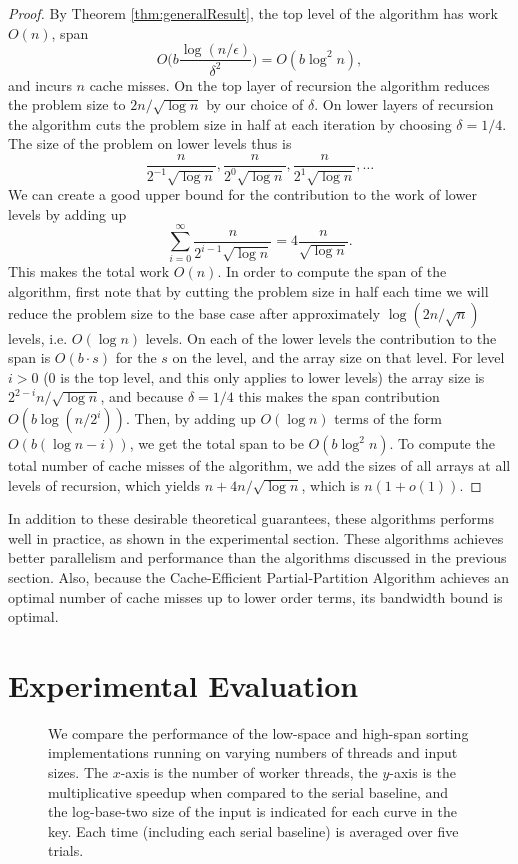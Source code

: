 \documentclass[sigconf]{acmart}
\theoremstyle{remark}
\theoremstyle{remark}
\begin{document}
\begin{proof}
	By Theorem \ref{thm:generalResult}, the top level of the algorithm has work $O(n)$, span $$O\Big(b\frac{\log(n/\epsilon)}{\delta^2}\Big)=O(b\log^2 n),$$ and incurs $n$ cache misses.  
	On the top layer of recursion the algorithm reduces the problem size to $2 n/\sqrt{\log n}$ by our choice of $\delta$.
	On lower layers of recursion the algorithm cuts the problem size in half at each iteration by choosing $\delta = 1/4$.
	The size of the problem on lower levels thus is 
	$$\frac{n}{2^{-1}\sqrt{\log n}}, \frac{n}{2^{0}\sqrt{\log n}}, \frac{n}{2^{1}\sqrt{\log n}}, \ldots$$
	We can create a good upper bound for the contribution to the work of lower levels by adding up $$\sum_{i=0}^{\infty}\frac{n}{2^{i-1}\sqrt{\log n}} = 4\frac{n}{\sqrt{\log n}}.$$
	This makes the total work $O(n)$.
	In order to compute the span of the algorithm, first note that by cutting the problem size in half each time we will reduce the problem size to the base case after approximately $\log (2n/\sqrt{n})$ levels, i.e. $O(\log n)$ levels.
	On each of the lower levels the contribution to the span is $O(b\cdot s)$ for the $s$ on the level, and the array size on that level.
	For level $i>0$ (0 is the top level, and this only applies to lower levels) the array size is $2^{2-i}n/\sqrt{\log n}$, and because $\delta=1/4$ this makes the span contribution $O(b\log (n/2^i))$.
	Then, by adding up $O(\log n)$ terms of the form $O(b(\log n - i))$, we get the total span to be $O(b\log^2 n)$.
	To compute the total number of cache misses of the algorithm, we add the sizes of all arrays at all levels of recursion, which yields $n+4n/\sqrt{\log n}$, which is $n(1+o(1))$.
\end{proof}

In addition to these desirable theoretical guarantees, these algorithms performs well in practice, as shown in the experimental section.
These algorithms achieves better parallelism and performance than the algorithms discussed in the previous section.
Also, because the Cache-Efficient Partial-Partition Algorithm achieves an optimal number of cache misses up to lower order terms, its bandwidth bound is optimal.

\section{Experimental Evaluation}\label{secexp}



\begin{figure*}
  \begin{center}
    \CILKsorttable
  \end{center}
  \caption{We compare the performance of the low-space and high-span
    sorting implementations running on varying numbers of threads and
    input sizes. The $x$-axis is the number of worker threads, the
    $y$-axis is the multiplicative speedup when compared to the serial
    baseline, and the log-base-two size of the input is indicated for
    each curve in the key. Each time (including each serial baseline)
    is averaged over five trials.}
  \label{tablesort}
\end{figure*}
\end{document}
